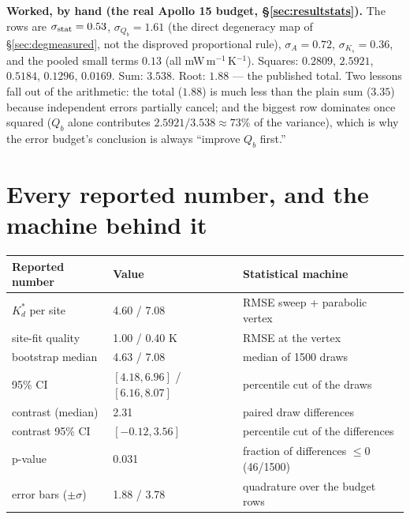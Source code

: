 \documentclass[11pt]{report}
\begin{document}
\noindent\textbf{Worked, by hand (the real Apollo 15 budget,
\S\ref{sec:resultstats}).} The rows are $\sigma_{\rm stat}=0.53$,
$\sigma_{Q_b}=1.61$ (the direct degeneracy map of \S\ref{sec:degmeasured},
not the disproved proportional rule), $\sigma_{A}=0.72$,
$\sigma_{K_s}=0.36$, and the pooled
small terms $0.13$ (all mW\,m$^{-1}$\,K$^{-1}$). Squares: $0.2809$, $2.5921$,
$0.5184$, $0.1296$, $0.0169$. Sum: $3.538$. Root: $\boxed{1.88}$ --- the
published total. Two lessons fall out of the arithmetic: the total ($1.88$) is
much less than the plain sum ($3.35$) because independent errors partially
cancel; and the biggest row dominates once squared ($Q_b$ alone contributes
$2.5921/3.538 \approx 73\%$ of the variance), which is why the error budget's
conclusion is always ``improve $Q_b$ first.''

\section{Every reported number, and the machine behind it}

\begin{center}\small
\begin{tabular}{@{}lll@{}}
\toprule
Reported number & Value & Statistical machine \\
\midrule
$K_d^{*}$ per site & 4.60 / 7.08 & RMSE sweep + parabolic vertex \\
site-fit quality & 1.00 / 0.40 K & RMSE at the vertex \\
bootstrap median & 4.63 / 7.08 & median of 1500 draws \\
95\% CI & $[4.18,6.96]$ / $[6.16,8.07]$ & percentile cut of the draws \\
contrast (median) & 2.31 & paired draw differences \\
contrast 95\% CI & $[-0.12, 3.56]$ & percentile cut of the differences \\
p-value & 0.031 & fraction of differences $\leq 0$ (46/1500) \\
error bars ($\pm\sigma$) & 1.88 / 3.78 & quadrature over the budget rows \\
\bottomrule
\end{tabular}
\end{center}

\medskip
{}

\appendix
\end{document}
